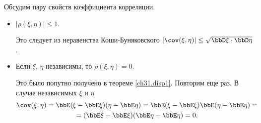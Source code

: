 Обсудим пару свойств коэффициента корреляции.
\begin{itemize}
\item 
$|\rho(\xi,\eta)|\le1$.

Это следует из неравенства Коши-Буняковского $|\cov(\xi,\eta)| \le \sqrt{\bbD\xi\cdot \bbD\eta}$.
\item
Если $\xi$, $\eta$ независимы, то $\rho(\xi,\eta)=0$.

Это было попутно получено в теореме \ref{ch31.disp1}. Повторим еще раз. В случае независимых $\xi$ и $\eta$
\begin{multline*}
\cov(\xi,\eta)=\bbE(\xi - \bbE\xi)(\eta - \bbE\eta) = \bbE(\xi - \bbE\xi)\bbE(\eta - \bbE\eta)=\\ = (\bbE\xi - \bbE\xi)(\bbE\eta - \bbE\eta) = 0.
\end{multline*}
\end{itemize}
